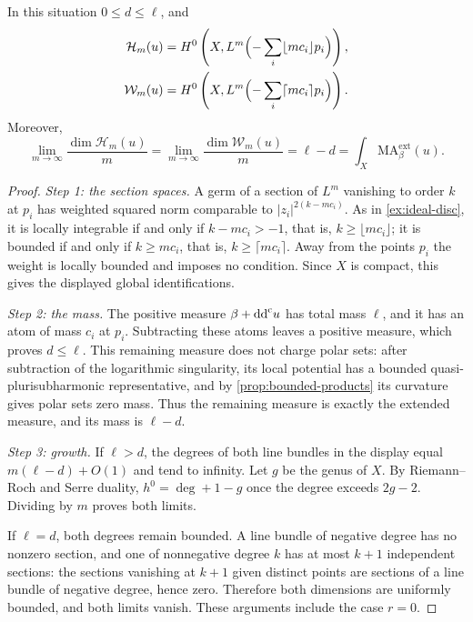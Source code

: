\begin{theorem}\label{thm:curve-weighted-section-growth}
In this situation $0\leq d\leq\ell$, and
\[
 \begin{split}
 \mathcal H_m(u)&=H^0\left(X,L^m\Bigl(-\sum_i\lfloor mc_i\rfloor p_i\Bigr)\right),\\
 \mathcal W_m(u)&=H^0\left(X,L^m\Bigl(-\sum_i\lceil mc_i\rceil p_i\Bigr)\right).
 \end{split}
\]
Moreover,
\[
 \lim_{m\to\infty}\frac{\dim\mathcal H_m(u)}m
 =\lim_{m\to\infty}\frac{\dim\mathcal W_m(u)}m
 =\ell-d
 =\int_X\mathrm{MA}^{\mathrm{ext}}_\beta(u).
\]
\end{theorem}
\begin{proof}
\emph{Step 1: the section spaces.} A germ of a section of $L^m$ vanishing to order $k$ at $p_i$ has weighted squared norm comparable to $|z_i|^{2(k-mc_i)}$. As in \cref{ex:ideal-disc}, it is locally integrable if and only if $k-mc_i>-1$, that is, $k\geq\lfloor mc_i\rfloor$; it is bounded if and only if $k\geq mc_i$, that is, $k\geq\lceil mc_i\rceil$. Away from the points $p_i$ the weight is locally bounded and imposes no condition. Since $X$ is compact, this gives the displayed global identifications.

\emph{Step 2: the mass.} The positive measure $\beta+\mathrm{dd}^{\mathrm{c}} u$ has total mass $\ell$, and it has an atom of mass $c_i$ at $p_i$. Subtracting these atoms leaves a positive measure, which proves $d\leq\ell$. This remaining measure does not charge polar sets: after subtraction of the logarithmic singularity, its local potential has a bounded quasi-plurisubharmonic representative, and by \cref{prop:bounded-products} its curvature gives polar sets zero mass. Thus the remaining measure is exactly the extended measure, and its mass is $\ell-d$.

\emph{Step 3: growth.} If $\ell>d$, the degrees of both line bundles in the display equal $m(\ell-d)+O(1)$ and tend to infinity. Let $g$ be the genus of $X$. By Riemann--Roch and Serre duality, $h^0=\deg+1-g$ once the degree exceeds $2g-2$. Dividing by $m$ proves both limits.

If $\ell=d$, both degrees remain bounded. A line bundle of negative degree has no nonzero section, and one of nonnegative degree $k$ has at most $k+1$ independent sections: the sections vanishing at $k+1$ given distinct points are sections of a line bundle of negative degree, hence zero. Therefore both dimensions are uniformly bounded, and both limits vanish. These arguments include the case $r=0$.
\end{proof}

